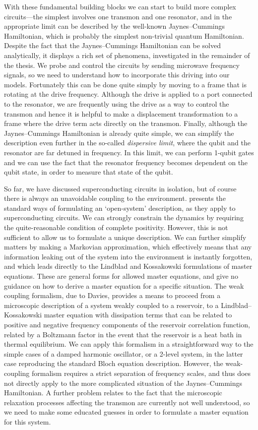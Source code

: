 With these fundamental building blocks we can start to build more complex circuits---the simplest involves one transmon and one resonator, and in the appropriate limit can be described by the well-known Jaynes--Cummings Hamiltonian, which is probably the simplest non-trivial quantum Hamiltonian. Despite the fact that the Jaynes--Cummings Hamiltonian can be solved analytically, it displays a rich set of phenomena, investigated in the remainder of the thesis. We probe and control the circuits by sending microwave frequency signals, so we need to understand how to incorporate this driving into our models. Fortunately this can be done quite simply by moving to a frame that is rotating at the drive frequency. Although the drive is applied to a port connected to the resonator, we are frequently using the drive as a way to control the transmon and hence it is helpful to make a displacement transformation to a frame where the drive term acts directly on the transmon. Finally, although the Jaynes--Cummings Hamiltonian is already quite simple, we can simplify the description even further in the so-called \emph{dispersive limit}, where the qubit and the resonator are far detuned in frequency. In this limit, we can perform 1-qubit gates and we can use the fact that the resonator frequency becomes dependent on the qubit state, in order to measure that state of the qubit.

So far, we have discussed superconducting circuits in isolation, but of course there is always an unavoidable coupling to the environment.  presents the standard ways of  formulating an `open-system' description, as they apply to superconducting circuits. We can strongly constrain the dynamics by requiring the quite-reasonable condition of complete positivity. However, this is not sufficient to allow us to formulate a unique description. We can further simplify matters by making a Markovian approximation, which effectively means that any information leaking out of the system into the environment is instantly forgotten, and which leads directly to the Lindblad and Kossakowski formulations of master equations. These are general forms for allowed master equations, and give no guidance on how to derive a master equation for a specific situation. The weak coupling formalism, due to Davies, provides a means to proceed from a microscopic description of a system weakly coupled to a reservoir, to a Lindblad--Kossakowski master equation with dissipation terms that can be related to positive and negative frequency components of the reservoir correlation function, related by a Boltzmann factor in the event that the reservoir is a heat bath in thermal equilibrium. We can apply this formalism in a straightforward way to the simple cases of a damped harmonic oscillator, or a 2-level system, in the latter case reproducing the standard Bloch equation description. However, the weak-coupling formalism requires a strict separation of frequency scales, and thus does not directly apply to the more complicated situation of the Jaynes--Cummings Hamiltonian. A further problem relates to the fact that the microscopic relaxation processes affecting the transmon are currently not well understood, so we need to make some educated guesses in order to formulate a master equation for this system.

